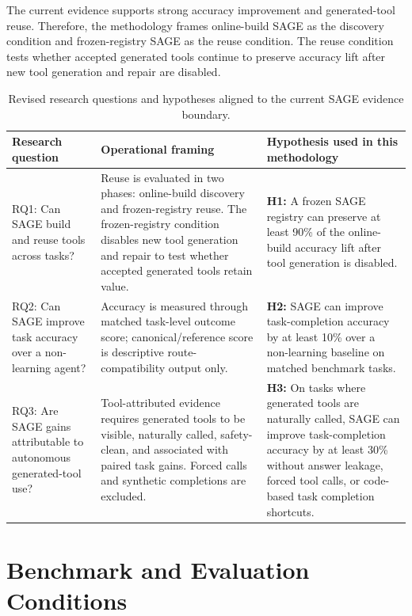 The current evidence supports strong accuracy improvement and generated-tool reuse. Therefore, the methodology frames online-build SAGE as the discovery condition and frozen-registry SAGE as the reuse condition. The reuse condition tests whether accepted generated tools continue to preserve accuracy lift after new tool generation and repair are disabled.

\begin{table}[H]
\centering
\footnotesize
\begin{tabularx}{\textwidth}{p{3.2cm} X X}
\toprule
\textbf{Research question} & \textbf{Operational framing} & \textbf{Hypothesis used in this methodology} \\
\midrule
RQ1: Can SAGE build and reuse tools across tasks? & Reuse is evaluated in two phases: online-build discovery and frozen-registry reuse. The frozen-registry condition disables new tool generation and repair to test whether accepted generated tools retain value. & \textbf{H1:} A frozen SAGE registry can preserve at least 90\% of the online-build accuracy lift after tool generation is disabled. \\
\addlinespace
RQ2: Can SAGE improve task accuracy over a non-learning agent? & Accuracy is measured through matched task-level outcome score; canonical/reference score is descriptive route-compatibility output only. & \textbf{H2:} SAGE can improve task-completion accuracy by at least 10\% over a non-learning baseline on matched benchmark tasks. \\
\addlinespace
RQ3: Are SAGE gains attributable to autonomous generated-tool use? & Tool-attributed evidence requires generated tools to be visible, naturally called, safety-clean, and associated with paired task gains. Forced calls and synthetic completions are excluded. & \textbf{H3:} On tasks where generated tools are naturally called, SAGE can improve task-completion accuracy by at least 30\% without answer leakage, forced tool calls, or code-based task completion shortcuts. \\
\bottomrule
\end{tabularx}
\caption{Revised research questions and hypotheses aligned to the current SAGE evidence boundary.}
\label{tab:sage_research_questions_hypotheses}
\end{table}

\section{Benchmark and Evaluation Conditions}
\label{sec:sage_benchmark_evaluation}

